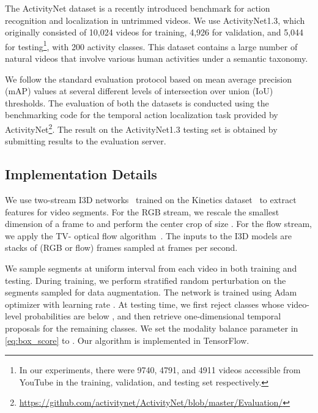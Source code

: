 \documentclass[10pt,twocolumn,letterpaper]{article}
\begin{document}
The ActivityNet dataset is a recently introduced benchmark for action recognition and localization in untrimmed videos.
We use ActivityNet1.3, which originally consisted of 10,024 videos for training, 4,926 for validation, and 5,044 for testing\footnote{In our experiments, there were 9740, 4791, and 4911 videos accessible from YouTube in the training, validation, and testing set respectively.}, with 200 activity classes.
This dataset contains a large number of natural videos that involve various human activities under a semantic taxonomy.

We follow the standard evaluation protocol based on mean average precision (mAP) values at several different levels of intersection over union (IoU) thresholds.
The evaluation of both the datasets is conducted using the benchmarking code for the temporal action localization task provided by ActivityNet\footnote{\url{https://github.com/activitynet/ActivityNet/blob/master/Evaluation/}}.
The result on the ActivityNet1.3 testing set is obtained by submitting results to the evaluation server.



\subsection{Implementation Details}
We use two-stream I3D networks~\cite{carreira17quo} trained on the Kinetics dataset~\cite{kay2017kinetics} to extract features for video segments.
For the RGB stream, we rescale the smallest dimension of a frame to  and perform the center crop of size .
For the flow stream, we apply the TV- optical flow algorithm~\cite{wedel09improved}.
The inputs to the I3D models are stacks of  (RGB or flow) frames sampled at  frames per second.


We sample  segments at uniform interval from each video in both training and testing.
During training, we perform stratified random perturbation on the segments sampled for data augmentation. 
The network is trained using Adam optimizer with learning rate .
At testing time, we first reject classes whose video-level probabilities are below , and then retrieve one-dimensional temporal proposals for the remaining classes.
We set the modality balance parameter  in \eqref{eq:box_score} to .
Our algorithm is implemented in TensorFlow.
\end{document}
